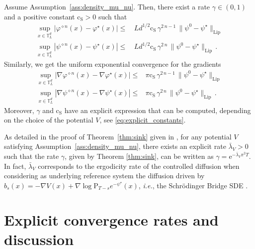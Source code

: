 \documentclass[final,12pt]{colt2023} %
\def\ie{\textit{i.e.}}
\newcommand{\rmP}{\mathrm{P}}
\newcommand{\rme}{\mathrm{e}}
\def\ie{\textit{i.e.}}
\def\varphistar{\varphi^\star}
\def\psistar{\psi^{\star}}
\def\cconst{\mathrm{c}_{\mathrm{S}}}
\def\blambda{\bar{\lambda}}
\def\blambdaV{\blambda_V}
\begin{document}
\begin{theorem}\label{thm:sink}
Assume Assumption~\ref{ass:density_mu_nu}. Then, there exist a rate $\gamma\in(0,1)$ and a positive constant $\cconst>0$ such that
\begin{equation}\label{eq:exp:conv}
\begin{aligned}
\sup_{x\in\mathbb{T}_L^d} |\varphi^{\diamond n}(x)-\varphistar(x)|\leq &\, Ld^{1/2}  \cconst \, \gamma^{2\,n-1}\, \|\psi^{ 0}-\psistar\|_{\mathrm{Lip}}\\
\sup_{x\in\mathbb{T}_L^d} |\psi^{\diamond n}(x)-\psistar(x)|
\leq&\, Ld^{1/2}  \cconst \, \gamma^{2\,n}\,\|\psi^{0}-\psistar\|_{\mathrm{Lip}}\,.
\end{aligned}
\end{equation}
Similarly, we get the uniform exponential convergence for the gradients
\begin{equation}\label{eq:exp:conv:grad}
\begin{aligned}
\sup_{x\in\mathbb{T}_L^d} |\nabla\varphi^{\diamond n}(x)-\nabla\varphistar(x)|\leq & \pi \cconst\, \gamma^{2\,n-1}\,\|\psi^{0}-\psistar\|_{\mathrm{Lip}}\\
\sup_{x\in\mathbb{T}_L^d} |\nabla\psi^{\diamond n}(x)-\nabla\psistar(x)|
\leq& \pi \cconst\, \gamma^{2\,n}\,\|\psi^{0}-\psistar\|_{\mathrm{Lip}}\,.
\end{aligned}
\end{equation}
Moreover, $\gamma$ and $\cconst$ have an explicit expression that can be computed, depending on the choice of the potential $V$, see \eqref{eq:explicit_constants}. 
\end{theorem}

As detailed in the proof of Theorem~\ref{thm:sink} given in , for any potential $V$ satisfying Assumption~\ref{ass:density_mu_nu}, there exists an explicit rate $\blambdaV>0$ such that the rate $\gamma$, given by Theorem \ref{thm:sink}, can be written as  $\gamma=\rme^{-\blambdaV\pi^2 T}$. In fact, $\blambdaV$ corresponds to the ergodicity rate of the controlled diffusion when considering as underlying reference system the diffusion driven by $b_s(x)=-\nabla V(x)+\nabla\log \rmP_{T-s}e^{-\psistar}(x)$, \ie, the Schr\"odinger Bridge SDE \citep{follmer1997gantert}.


\section{Explicit convergence rates and discussion}
\label{sec:explicit_rates}
\end{document}
